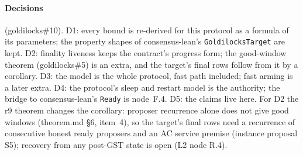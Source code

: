 \documentclass{article}
\begin{document}
\paragraph{Decisions} (goldilocks\#10).  D1: every bound is re-derived for
this protocol as a formula of its parameters; the property shapes of
consensus-lean's \texttt{GoldilocksTarget} are kept.  D2: finality liveness
keeps the contract's progress form; the good-window theorem (goldilocks\#5)
is an extra, and the target's final rows follow from it by a corollary.  D3:
the model is the whole protocol, fast path included; fast arming is a later
extra.  D4: the protocol's sleep and restart model is the authority; the
bridge to consensus-lean's \texttt{Ready} is node~F.4.  D5: the claims
live here.  For D2 the r9 theorem changes the corollary: proposer recurrence
alone does not give good windows (theorem.md \S6, item~4), so the target's
final rows need a recurrence of consecutive honest ready proposers and an AC
service premise (instance proposal S5); recovery from any post-GST state is
open (L2 node R.4).
\end{document}
